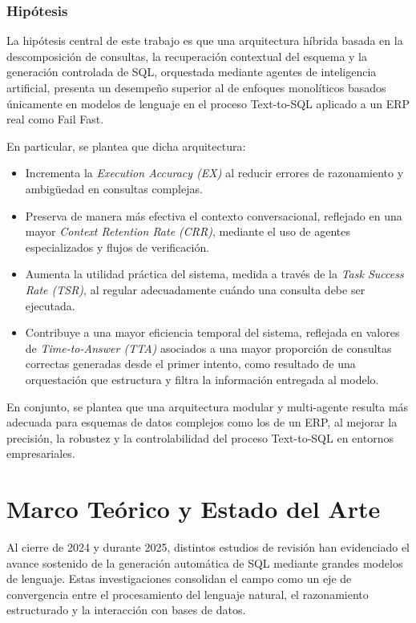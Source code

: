 \documentclass[journal]{IEEEtran}
\begin{document}
\subsubsection{Hipótesis}

La hipótesis central de este trabajo es que una arquitectura híbrida basada en la descomposición de consultas, la recuperación contextual del esquema y la generación controlada de SQL, orquestada mediante agentes de inteligencia artificial, presenta un desempeño superior al de enfoques monolíticos basados únicamente en modelos de lenguaje en el proceso Text-to-SQL aplicado a un ERP real como Fail Fast.

En particular, se plantea que dicha arquitectura:

\begin{itemize}
	\item Incrementa la \textit{Execution Accuracy (EX)} al reducir errores de razonamiento y ambigüedad en consultas complejas.
	\item Preserva de manera más efectiva el contexto conversacional, reflejado en una mayor \textit{Context Retention Rate (CRR)}, mediante el uso de agentes especializados y flujos de verificación.
	\item Aumenta la utilidad práctica del sistema, medida a través de la \textit{Task Success Rate (TSR)}, al regular adecuadamente cuándo una consulta debe ser ejecutada.
	\item Contribuye a una mayor eficiencia temporal del sistema, reflejada en valores de \textit{Time-to-Answer (TTA)} asociados a una mayor proporción de consultas correctas generadas desde el primer intento, como resultado de una orquestación que estructura y filtra la información entregada al modelo.
\end{itemize}

En conjunto, se plantea que una arquitectura modular y multi-agente resulta más adecuada para esquemas de datos complejos como los de un ERP, al mejorar la precisión, la robustez y la controlabilidad del proceso Text-to-SQL en entornos empresariales.


\section{Marco Teórico y Estado del Arte}

Al cierre de 2024 y durante 2025, distintos estudios de revisión \cite{shi2025comprehensive, liu2025survey, hong2025advances, singh2025survey, zhu2024large} han evidenciado el avance sostenido de la generación automática de SQL mediante grandes modelos de lenguaje. Estas investigaciones consolidan el campo como un eje de convergencia entre el procesamiento del lenguaje natural, el razonamiento estructurado y la interacción con bases de datos.
\end{document}

